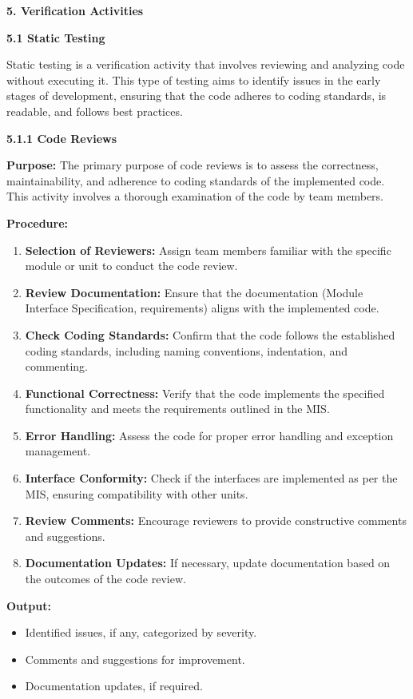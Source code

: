 \documentclass[
]{article}
\begin{document}
\textbf{5. Verification Activities}

\textbf{5.1 Static Testing}

Static testing is a verification activity that involves reviewing and
analyzing code without executing it. This type of testing aims to
identify issues in the early stages of development, ensuring that the
code adheres to coding standards, is readable, and follows best
practices.

\textbf{5.1.1 Code Reviews}

\textbf{Purpose:} The primary purpose of code reviews is to assess the
correctness, maintainability, and adherence to coding standards of the
implemented code. This activity involves a thorough examination of the
code by team members.

\textbf{Procedure:}

\begin{enumerate}
\def\labelenumi{\arabic{enumi}.}
\item
  \textbf{Selection of Reviewers:} Assign team members familiar with the
  specific module or unit to conduct the code review.
\item
  \textbf{Review Documentation:} Ensure that the documentation (Module
  Interface Specification, requirements) aligns with the implemented
  code.
\item
  \textbf{Check Coding Standards:} Confirm that the code follows the
  established coding standards, including naming conventions,
  indentation, and commenting.
\item
  \textbf{Functional Correctness:} Verify that the code implements the
  specified functionality and meets the requirements outlined in the
  MIS.
\item
  \textbf{Error Handling:} Assess the code for proper error handling and
  exception management.
\item
  \textbf{Interface Conformity:} Check if the interfaces are implemented
  as per the MIS, ensuring compatibility with other units.
\item
  \textbf{Review Comments:} Encourage reviewers to provide constructive
  comments and suggestions.
\item
  \textbf{Documentation Updates:} If necessary, update documentation
  based on the outcomes of the code review.
\end{enumerate}

\textbf{Output:}

\begin{itemize}
\item
  Identified issues, if any, categorized by severity.
\item
  Comments and suggestions for improvement.
\item
  Documentation updates, if required.
\end{itemize}
\end{document}
